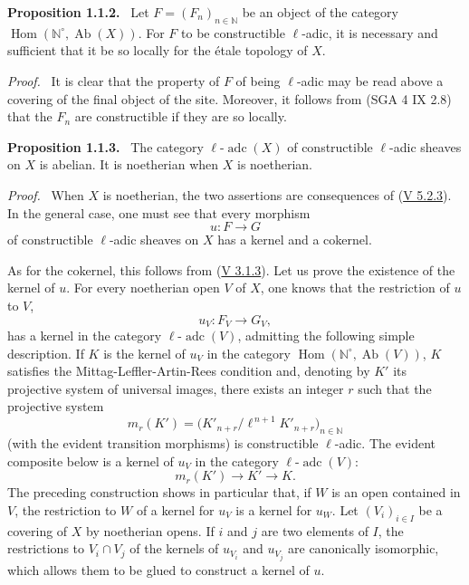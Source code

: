 \documentclass[11pt]{article}
\newenvironment{statement}[1]{\par\medskip\noindent\textbf{#1.}\ }{\par\medskip}
\newenvironment{prooftext}[1][Proof]{\par\noindent\emph{#1.}\ }{\par\medskip}
\DeclareMathOperator{\Hom}{Hom}
\providecommand{\Hom}{\operatorname{Hom}}
\providecommand{\Ab}{\operatorname{Ab}}
\providecommand{\adc}{\operatorname{adc}}
\providecommand{\Ab}{\operatorname{Ab}}
\providecommand{\Hom}{\operatorname{Hom}}
\begin{document}
\label{sga5:VI:proposition:1.1.2}\begin{statement}{Proposition 1.1.2}
Let \(F=(F_n)_{n\in\mathbb N}\) be an object of the category \(\Hom(\mathbb N^\circ,\Ab(X))\). For \(F\) to be constructible \(\ell\)-adic, it is necessary and sufficient that it be so locally for the étale topology of \(X\).
\end{statement}

\begin{prooftext}[Proof]
It is clear that the property of \(F\) of being \(\ell\)-adic may be read above a covering of the final object of the site. Moreover, it follows from (SGA 4 IX 2.8) that the \(F_n\) are constructible if they are so locally.
\end{prooftext}

\label{sga5:VI:proposition:1.1.3}\begin{statement}{Proposition 1.1.3}
The category \(\ell\text{-}\adc(X)\) of constructible \(\ell\)-adic sheaves on \(X\) is abelian. It is noetherian when \(X\) is noetherian.
\end{statement}

\begin{prooftext}[Proof]
When \(X\) is noetherian, the two assertions are consequences of (\hyperref[sga5:V:theorem:5.2.3]{V 5.2.3}). In the general case, one must see that every morphism
\[
u:F\longrightarrow G
\]
of constructible \(\ell\)-adic sheaves on \(X\) has a kernel and a cokernel.

As for the cokernel, this follows from (\hyperref[sga5:V:proposition:3.1.3]{V 3.1.3}). Let us prove the existence of the kernel of \(u\). For every noetherian open \(V\) of \(X\), one knows that the restriction of \(u\) to \(V\),
\[
u_V:F_V\longrightarrow G_V,
\]
has a kernel in the category \(\ell\text{-}\adc(V)\), admitting the following simple description. If \(K\) is the kernel of \(u_V\) in the category \(\Hom(\mathbb N^\circ,\Ab(V))\), \(K\) satisfies the Mittag-Leffler-Artin-Rees condition and, denoting by \(K'\) its projective system of universal images, there exists an integer \(r\) such that the projective system
\[
m_r(K')=\bigl(K'_{n+r}/\ell^{\,n+1}K'_{n+r}\bigr)_{n\in\mathbb N}
\]
(with the evident transition morphisms) is constructible \(\ell\)-adic. The evident composite below is a kernel of \(u_V\) in the category \(\ell\text{-}\adc(V)\):
\[
m_r(K')\longrightarrow K'\longrightarrow K.
\]
The preceding construction shows in particular that, if \(W\) is an open contained in \(V\), the restriction to \(W\) of a kernel for \(u_V\) is a kernel for \(u_W\). Let \((V_i)_{i\in I}\) be a covering of \(X\) by noetherian opens. If \(i\) and \(j\) are two elements of \(I\), the restrictions to \(V_i\cap V_j\) of the kernels of \(u_{V_i}\) and \(u_{V_j}\) are canonically isomorphic, which allows them to be glued to construct a kernel of \(u\).
\end{prooftext}
\end{document}
